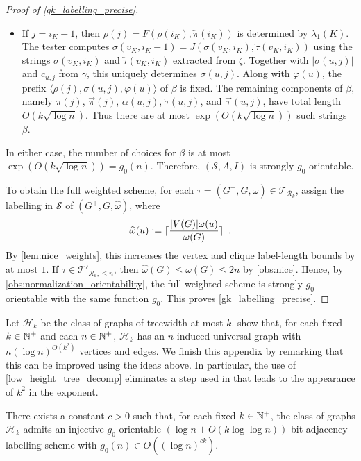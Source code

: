 \documentclass{patmorin}
\renewcommand{\le}{\leqslant}
\newcommand{\Oh}{O}
\DeclarePairedDelimiter{\ceil}{\lceil}{\rceil}
\newcommand{\calH}{\mathcal{H}}
\newcommand{\calR}{\mathcal{R}}
\newcommand{\calS}{\mathcal{S}}
\newcommand{\calT}{\mathcal{T}}
\begin{document}
\begin{proof}[Proof of \cref{gk_labelling_precise}]
\begin{itemize}[nosep,nolistsep]
    \item If $j=i_K-1$, then $\rho(j)=F(\rho(i_K),\overleftarrow{\pi}(i_K))$ is determined by $\lambda_1(K)$. The tester computes $\sigma(v_K,i_K-1)=J(\sigma(v_K,i_K),\overleftarrow{\tau}(v_K,i_K))$ using the strings $\sigma(v_K,i_K)$ and $\overleftarrow{\tau}(v_K,i_K)$ extracted from $\zeta$. Together with $|\sigma(u,j)|$ and $c_{u,j}$ from $\gamma$, this uniquely determines $\sigma(u,j)$. Along with $\varphi(u)$, the prefix $\langle \rho(j), \sigma(u,j), \varphi(u)\rangle$ of $\beta$ is fixed. The remaining components of $\beta$, namely $\overleftarrow{\pi}(j)$, $\overrightarrow{\pi}(j)$, $\alpha(u,j)$, $\overleftarrow{\tau}(u,j)$, and $\overrightarrow{\tau}(u,j)$, have total length $\Oh(k\sqrt{\log n})$. Thus there are at most $\exp(\Oh(k\sqrt{\log n}))$ such strings $\beta$.
  \end{itemize}
  In either case, the number of choices for $\beta$ is at most $\exp(\Oh(k\sqrt{\log n})) = g_0(n)$. Therefore, $(\calS,A,I)$ is strongly $g_0$-orientable.

  To obtain the full weighted scheme, for each $\tau=(G^+,G,\omega)\in\calT_{\calR_k}$, assign the labelling in $\calS$ of $(G^+,G,\widehat\omega)$, where
  \[
    \widehat\omega(u):=\ceil{\frac{|V(G)|\omega(u)}{\omega(G)}}\enspace.
  \]
  By \cref{lem:nice_weights}, this increases the vertex and clique label-length bounds by at most $1$. If $\tau\in\calT'_{\calR_k,\le n}$, then $\widehat\omega(G)\le\omega(G)\le 2n$ by \cref{obs:nice}. Hence, by \cref{obs:normalization_orientability}, the full weighted scheme is strongly $g_0$-orientable with the same function $g_0$. This proves \cref{gk_labelling_precise}. \qedhere
\end{proof}

Let $\calH_k$ be the class of graphs of treewidth at most $k$.  \citet{EJM23} show that, for each fixed $k\in\mathbb{N}^+$ and each $n\in\mathbb{N}^+$, $\calH_k$ has an $n$-induced-universal graph with $n(\log n)^{\Oh(k^2)}$ vertices and edges.
We finish this appendix by remarking that this can be improved using the ideas above.  In particular, the use of \cref{low_height_tree_decomp} eliminates a step used in \cite{EJM23} that leads to the appearance of $k^2$ in the exponent.

\begin{lem}\label{treewidth_result}
  There exists a constant $c>0$ such that, for each fixed $k\in\mathbb{N}^+$, the class of graphs $\calH_k$ admits an injective $g_0$-orientable $(\log n + \Oh(k\log\log n))$-bit adjacency labelling scheme with $g_0(n)\in \Oh((\log n)^{ck})$.
\end{lem}
\end{document}
